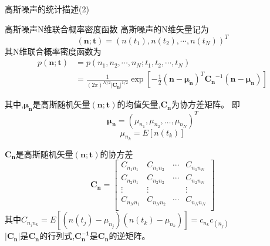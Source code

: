 \begin{frame}{高斯噪声的统计描述(2)}
\begin{block}{高斯噪声N维联合概率密度函数}
高斯噪声的N维矢量记为
\[(\bm{n;t})=(n(t_1),n(t_2),\cdots,n(t_N))^T \]
其N维联合概率密度函数为
\begin{align*}
p(\bm{n;t})&=p(n_1,n_2,\cdots,n_N; t_1,t_2,\cdots,t_N)\\
&=\frac{1}{(2\pi)^{N/2}|\bm{C_n}|^{1/2}}\exp\left[-\frac{1}{2}(\bm{n-\mu_n})^T\bm{C_n}^{-1}(\bm{n-\mu_n})\right]
\end{align*}

其中,$\bm{\mu_{n}}$是高斯随机矢量$(\bm{n;t})$的均值矢量,$\bm{C_n}$为协方差矩阵。
即
$$\bm{\mu_n}=(\mu_{n_1},\mu_{n_2},\dots,\mu_{n_N})^T$$
$$\mu_{n_k}=E[n(t_k)]$$
\end{block}
\end{frame}

\begin{frame}
$\bm{C_n}$是高斯随机矢量$\bm{(n;t)}$的协方差
$$
\bm{C_n}=\left[
\begin{matrix}
C_{n_1n_1} & C_{n_1n_2} & \cdots &C_{n_1n_N} \\
C_{n_2n_1} & C_{n_2n_2} & \cdots &C_{n_2n_N} \\
\vdots     &  \vdots    &        &\vdots \\
C_{n_Nn_1} & C_{n_Nn_2} & \cdots &C_{n_Nn_N} \\
\end{matrix}
\right]
$$
其中$C_{n_jn_k}=E[(n(t_j)-\mu_{n_j})(n(t_k)-\mu_{n_k})]=c_{n_k}c_(n_j)$\\
$|\bm{C_n}|$是$\bm{C_n}$的行列式,$\bm{C_n^{-1}}$是$\bm{C_n}$的逆矩阵。
\end{frame}


